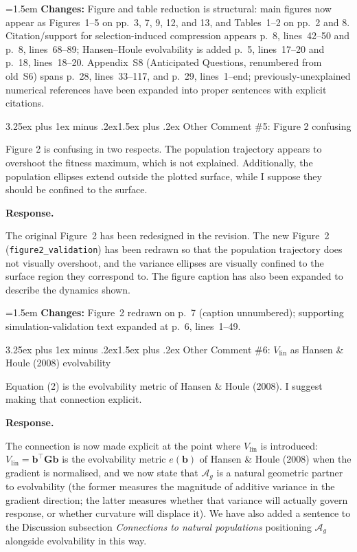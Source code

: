 \documentclass[11pt,a4paper]{article}
\makeatletter
\newcommand{\response}{%
  \par\medskip\noindent\textbf{\color{ResponseColor}Response.}\quad\ignorespaces
}
\newcommand{\changesat}[1]{%
  \par\smallskip\noindent\hangindent=1.5em\hangafter=1
  \textbf{\color{ChangeColor}Changes:} \quad #1\par\medskip
}
\renewcommand{\subsection}{\@startsection{subsection}{2}{0pt}%
  {3.25ex plus 1ex minus .2ex}{1.5ex plus .2ex}%
  {\large\bfseries}}
\newcommand{\Ag}{\ensuremath{\mathcal{A}_{g}}\xspace}
\newcommand{\Vlin}{\ensuremath{V_{\mathrm{lin}}}\xspace}
\newcommand{\mat}[1]{\ensuremath{\mathbf{#1}}}
\newcommand{\vect}[1]{\ensuremath{\bm{#1}}}
\makeatother
\begin{document}
\changesat{Figure and table reduction is structural: main figures now appear as Figures~1--5 on pp.~3, 7, 9, 12, and 13, and Tables~1--2 on pp.~2 and 8. Citation/support for selection-induced compression appears p.~8, lines~42--50 and p.~8, lines~68--89; Hansen--Houle evolvability is added p.~5, lines~17--20 and p.~18, lines~18--20. Appendix~S8 (Anticipated Questions, renumbered from old~S6) spans p.~28, lines~33--117, and p.~29, lines~1--end; previously-unexplained numerical references have been expanded into proper sentences with explicit citations.}

\subsection{Other Comment \#5: Figure 2 confusing}

\begin{revquote}
Figure 2 is confusing in two respects. The population trajectory appears to overshoot the fitness maximum, which is not explained. Additionally, the population ellipses extend outside the plotted surface, while I suppose they should be confined to the surface.
\end{revquote}

\response
The original Figure~2 has been redesigned in the revision. The new Figure~2 (\texttt{figure2\_validation}) has been redrawn so that the population trajectory does not visually overshoot, and the variance ellipses are visually confined to the surface region they correspond to. The figure caption has also been expanded to describe the dynamics shown.

\changesat{Figure~2 redrawn on p.~7 (caption unnumbered); supporting simulation-validation text expanded at p.~6, lines~1--49.}

\subsection{\texorpdfstring{Other Comment \#6: $\Vlin$ as Hansen \& Houle (2008) evolvability}{Other Comment \#6: V_lin as Hansen & Houle (2008) evolvability}}

\begin{revquote}
Equation (2) is the evolvability metric of Hansen \& Houle (2008). I suggest making that connection explicit.
\end{revquote}

\response
The connection is now made explicit at the point where $\Vlin$ is introduced: $\Vlin = \vect{b}^{\top}\mat{G}\vect{b}$ is the evolvability metric $e(\vect{b})$ of Hansen \& Houle (2008) when the gradient is normalised, and we now state that $\Ag$ is a natural geometric partner to evolvability (the former measures the magnitude of additive variance in the gradient direction; the latter measures whether that variance will actually govern response, or whether curvature will displace it). We have also added a sentence to the Discussion subsection \textit{Connections to natural populations} positioning $\Ag$ alongside evolvability in this way.
\end{document}
